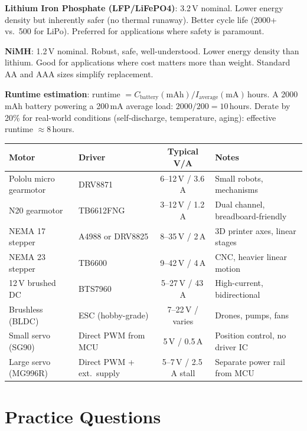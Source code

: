 \textbf{Lithium Iron Phosphate (LFP/LiFePO4)}: 3.2\,V nominal. Lower energy density but inherently safer (no thermal runaway). Better cycle life (2000+ vs.\ 500 for LiPo). Preferred for applications where safety is paramount.

\textbf{NiMH}: 1.2\,V nominal. Robust, safe, well-understood. Lower energy density than lithium. Good for applications where cost matters more than weight. Standard AA and AAA sizes simplify replacement.

\textbf{Runtime estimation}: runtime $= C_{\text{battery}}(\text{mAh}) / I_{\text{average}}(\text{mA})$\,hours. A 2000\,mAh battery powering a 200\,mA average load: $2000/200 = 10$\,hours. Derate by 20\% for real-world conditions (self-discharge, temperature, aging): effective runtime $\approx 8$\,hours.

\begin{quickrefbox}
\begin{table}[H]\centering\small
\begin{tabularx}{\linewidth}{l l c X}
\toprule
\textbf{Motor} & \textbf{Driver} & \textbf{Typical V/A} & \textbf{Notes} \\
\midrule
Pololu micro gearmotor & DRV8871 & 6--12\,V / 3.6\,A & Small robots, mechanisms \\
N20 gearmotor & TB6612FNG & 3--12\,V / 1.2\,A & Dual channel, breadboard-friendly \\
NEMA 17 stepper & A4988 or DRV8825 & 8--35\,V / 2\,A & 3D printer axes, linear stages \\
NEMA 23 stepper & TB6600 & 9--42\,V / 4\,A & CNC, heavier linear motion \\
12\,V brushed DC & BTS7960 & 5--27\,V / 43\,A & High-current, bidirectional \\
Brushless (BLDC) & ESC (hobby-grade) & 7--22\,V / varies & Drones, pumps, fans \\
Small servo (SG90) & Direct PWM from MCU & 5\,V / 0.5\,A & Position control, no driver IC \\
Large servo (MG996R) & Direct PWM + ext.\ supply & 5--7\,V / 2.5\,A stall & Separate power rail from MCU \\
\bottomrule
\end{tabularx}
\end{table}
\end{quickrefbox}

\section{Practice Questions}

